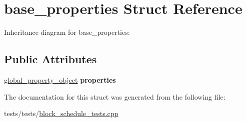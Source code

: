 \hypertarget{structbase__properties}{}\section{base\+\_\+properties Struct Reference}
\label{structbase__properties}


Inheritance diagram for base\+\_\+properties\+:
\subsection*{Public Attributes}
\begin{DoxyCompactItemize}
\item 
\mbox{\label{structbase__properties_aebe34db32a45c521ef6baf4b75063a71}} 
\mbox{\hyperlink{classaacio_1_1chain_1_1global__property__object}{global\+\_\+property\+\_\+object}} {\bfseries properties}
\end{DoxyCompactItemize}


The documentation for this struct was generated from the following file\+:\begin{DoxyCompactItemize}
\item 
tests/tests/\mbox{\hyperlink{block__schedule__tests_8cpp}{block\+\_\+schedule\+\_\+tests.\+cpp}}\end{DoxyCompactItemize}
